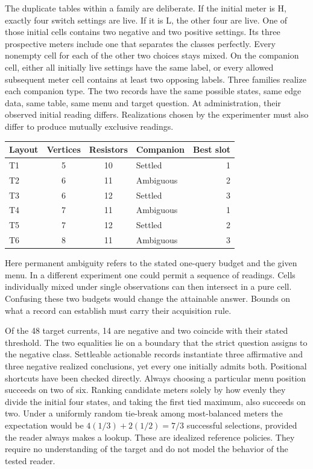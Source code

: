 \documentclass[12pt,letterpaper]{article}
\begin{document}
The duplicate tables within a family are deliberate. If the initial meter is H, exactly four switch settings are live. If it is L, the other four are live. One of those initial cells contains two negative and two positive settings. Its three prospective meters include one that separates the classes perfectly. Every nonempty cell for each of the other two choices stays mixed. On the companion cell, either all initially live settings have the same label, or every allowed subsequent meter cell contains at least two opposing labels. Three families realize each companion type. The two records have the same possible states, same edge data, same table, same menu and target question. At administration, their observed initial reading differs. Realizations chosen by the experimenter must also differ to produce mutually exclusive readings.

\begin{center}{\small\setlength{\tabcolsep}{4pt}\begin{tabularx}{\linewidth}{@{}lccYr@{}}\toprule
Layout & Vertices & Resistors & Companion & Best slot\\ \midrule
T1 & 5 & 10 & Settled & 1\\
T2 & 6 & 11 & Ambiguous & 2\\
T3 & 6 & 12 & Settled & 3\\
T4 & 7 & 11 & Ambiguous & 1\\
T5 & 7 & 12 & Settled & 2\\
T6 & 8 & 11 & Ambiguous & 3\\ \bottomrule\end{tabularx}}
\end{center}


Here permanent ambiguity refers to the stated one-query budget and the given menu. In a different experiment one could permit a sequence of readings. Cells individually mixed under single observations can then intersect in a pure cell. Confusing these two budgets would change the attainable answer. Bounds on what a record can establish must carry their acquisition rule.

Of the 48 target currents, 14 are negative and two coincide with their stated threshold. The two equalities lie on a boundary that the strict question assigns to the negative class. Settleable actionable records instantiate three affirmative and three negative realized conclusions, yet every one initially admits both. Positional shortcuts have been checked directly. Always choosing a particular menu position succeeds on two of six. Ranking candidate meters solely by how evenly they divide the initial four states, and taking the first tied maximum, also succeeds on two. Under a uniformly random tie-break among most-balanced meters the expectation would be $4(1/3)+2(1/2)=7/3$ successful selections, provided the reader always makes a lookup. These are idealized reference policies. They require no understanding of the target and do not model the behavior of the tested reader.
\end{document}
